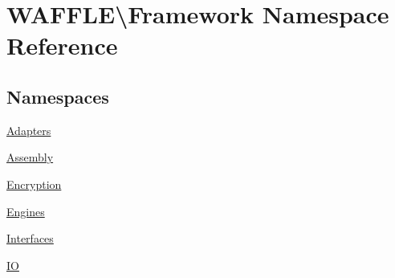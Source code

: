 \hypertarget{namespace_w_a_f_f_l_e_1_1_framework}{}\section{W\+A\+F\+F\+LE\textbackslash{}Framework Namespace Reference}
\label{namespace_w_a_f_f_l_e_1_1_framework}
\subsection*{Namespaces}
\begin{DoxyCompactItemize}
\item 
 \hyperlink{namespace_w_a_f_f_l_e_1_1_framework_1_1_adapters}{Adapters}
\item 
 \hyperlink{namespace_w_a_f_f_l_e_1_1_framework_1_1_assembly}{Assembly}
\item 
 \hyperlink{namespace_w_a_f_f_l_e_1_1_framework_1_1_encryption}{Encryption}
\item 
 \hyperlink{namespace_w_a_f_f_l_e_1_1_framework_1_1_engines}{Engines}
\item 
 \hyperlink{namespace_w_a_f_f_l_e_1_1_framework_1_1_interfaces}{Interfaces}
\item 
 \hyperlink{namespace_w_a_f_f_l_e_1_1_framework_1_1_i_o}{IO}
\end{DoxyCompactItemize}
